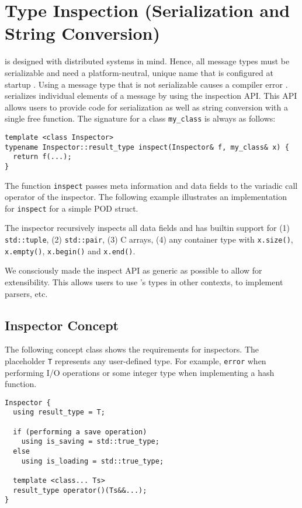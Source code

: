 \section{Type Inspection (Serialization and String Conversion)}
\label{type-inspection}

\lib is designed with distributed systems in mind. Hence, all message types must be serializable and need a platform-neutral, unique name that is configured at startup . Using a message type that is not serializable causes a compiler error . \lib serializes individual elements of a message by using the inspection API. This API allows users to provide code for serialization as well as string conversion with a single free function. The signature for a class \lstinline^my_class^ is always as follows:

\begin{lstlisting}
template <class Inspector>
typename Inspector::result_type inspect(Inspector& f, my_class& x) {
  return f(...);
}
\end{lstlisting}

The function \lstinline^inspect^ passes meta information and data fields to the variadic call operator of the inspector. The following example illustrates an implementation for \lstinline^inspect^ for a simple POD struct.



The inspector recursively inspects all data fields and has builtin support for (1) \lstinline^std::tuple^, (2) \lstinline^std::pair^, (3) C arrays, (4) any container type with \lstinline^x.size()^, \lstinline^x.empty()^, \lstinline^x.begin()^ and \lstinline^x.end()^.

We consciously made the inspect API as generic as possible to allow for extensibility. This allows users to use \lib's types in other contexts, to implement parsers, etc.

\subsection{Inspector Concept}

The following concept class shows the requirements for inspectors. The placeholder \lstinline^T^ represents any user-defined type. For example, \lstinline^error^ when performing I/O operations or some integer type when implementing a hash function.

\begin{lstlisting}
Inspector {
  using result_type = T;
  
  if (performing a save operation)
    using is_saving = std::true_type;
  else
    using is_loading = std::true_type;
  
  template <class... Ts>
  result_type operator()(Ts&&...);
}
\end{lstlisting}

